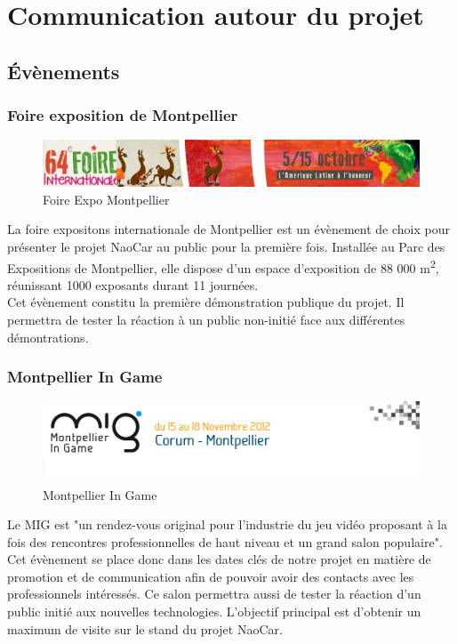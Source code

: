 \documentclass[11pt]{report} %
\begin{document}
	\section{Communication autour du projet}
		\subsection{Évènements}
			\subsubsection{Foire exposition de Montpellier}
				\begin{figure}[htb]
				\centering
				\includegraphics[width=1\textwidth]{foire-expo.png}
				\caption{Foire Expo Montpellier}
				\label{fig:Foire Expo Montpellier}
				\end{figure}
				La foire expositons internationale de Montpellier est un évènement de choix pour présenter le projet NaoCar au public pour la première fois. Installée au Parc des Expositions de Montpellier, elle dispose d'un espace d'exposition de 88 000 m\textsuperscript{2}, réunissant 1000 exposants durant 11 journées.\\
				Cet évènement constitu la première démonstration publique du projet. Il permettra de tester la réaction à un public non-initié face aux différentes démontrations.
			\subsubsection{Montpellier In Game}
				\begin{figure}[htb]
				\centering
				\includegraphics[width=1\textwidth]{mig.png}
				\caption{Montpellier In Game}
				\label{fig:Montpellier In Game}
				\end{figure}
	                        Le MIG est "un rendez-vous original pour l’industrie du jeu vidéo proposant à la fois des rencontres professionnelles de haut niveau et un grand salon populaire". \\Cet évènement se place donc dans les dates clés de notre projet en matière de promotion et de communication afin de pouvoir avoir des contacts avec les professionnels intéressés. Ce salon permettra aussi de tester la réaction d'un public initié aux nouvelles technologies.
			L'objectif principal est d'obtenir un maximum de visite sur le stand du projet NaoCar.
		\newpage
\end{document}
